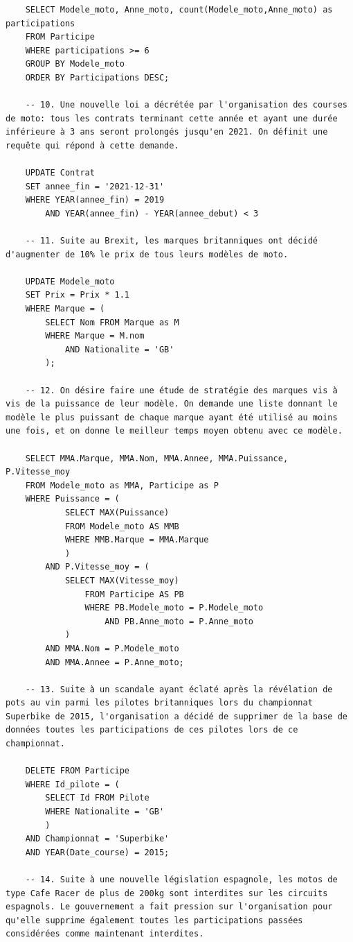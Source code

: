 \documentclass[12pt,a4paper]{article}
\newenvironment{code}{\captionsetup{type=listing}}{}
\begin{document}
\begin{code}
\begin{verbatim}
    SELECT Modele_moto, Anne_moto, count(Modele_moto,Anne_moto) as participations
    FROM Participe
    WHERE participations >= 6
    GROUP BY Modele_moto
    ORDER BY Participations DESC;

    -- 10. Une nouvelle loi a décrétée par l'organisation des courses de moto: tous les contrats terminant cette année et ayant une durée inférieure à 3 ans seront prolongés jusqu'en 2021. On définit une requête qui répond à cette demande.

    UPDATE Contrat
    SET annee_fin = '2021-12-31'
    WHERE YEAR(annee_fin) = 2019
        AND YEAR(annee_fin) - YEAR(annee_debut) < 3

    -- 11. Suite au Brexit, les marques britanniques ont décidé d'augmenter de 10% le prix de tous leurs modèles de moto.

    UPDATE Modele_moto
    SET Prix = Prix * 1.1
    WHERE Marque = (
        SELECT Nom FROM Marque as M
        WHERE Marque = M.nom
            AND Nationalite = 'GB'
        );

    -- 12. On désire faire une étude de stratégie des marques vis à vis de la puissance de leur modèle. On demande une liste donnant le modèle le plus puissant de chaque marque ayant été utilisé au moins une fois, et on donne le meilleur temps moyen obtenu avec ce modèle.

    SELECT MMA.Marque, MMA.Nom, MMA.Annee, MMA.Puissance, P.Vitesse_moy
    FROM Modele_moto as MMA, Participe as P
    WHERE Puissance = (
            SELECT MAX(Puissance)
            FROM Modele_moto AS MMB
            WHERE MMB.Marque = MMA.Marque
            )
        AND P.Vitesse_moy = (
            SELECT MAX(Vitesse_moy)
                FROM Participe AS PB
                WHERE PB.Modele_moto = P.Modele_moto
                    AND PB.Anne_moto = P.Anne_moto
            )
        AND MMA.Nom = P.Modele_moto
        AND MMA.Annee = P.Anne_moto;

    -- 13. Suite à un scandale ayant éclaté après la révélation de pots au vin parmi les pilotes britanniques lors du championnat Superbike de 2015, l'organisation a décidé de supprimer de la base de données toutes les participations de ces pilotes lors de ce championnat.

    DELETE FROM Participe
    WHERE Id_pilote = (
        SELECT Id FROM Pilote
        WHERE Nationalite = 'GB'
        )
    AND Championnat = 'Superbike'
    AND YEAR(Date_course) = 2015;

    -- 14. Suite à une nouvelle législation espagnole, les motos de type Cafe Racer de plus de 200kg sont interdites sur les circuits espagnols. Le gouvernement a fait pression sur l'organisation pour qu'elle supprime également toutes les participations passées considérées comme maintenant interdites.


\end{verbatim}
\end{code}
\end{document}
